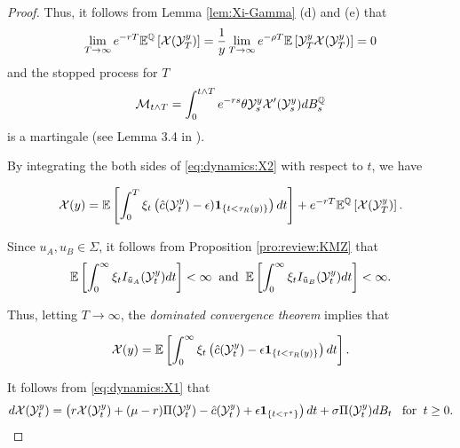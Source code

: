 \documentclass[a4paper,report, 11pt]{article}
\def\e{\epsilon}
\def\m{\mu}
\def\s{\sigma}
\def\t{\theta}
\begin{document}
\begin{proof}
	Thus, it follows from Lemma \ref{lem:Xi-Gamma} (d) and (e) that 
	\begin{align*}
	\lim_{T\to\infty}e^{-rT}\mathbb{E}^{\mathbb{Q}}\left[{\cal X}({\cal Y}_T^{y}) \right]=\dfrac{1}{y}\lim_{T\to\infty}e^{-\rho T}\mathbb{E}\left[{\cal Y}_T^{y}{\cal X}({\cal Y}_T^{y}) \right]=0
	\end{align*}
	and the stopped process for $T$
	$$
	{\cal M}_{t\wedge T} =\int_0^{t\wedge T} e^{-r s }\t {\cal Y}_s^{y}{\cal X}'({\cal Y}_s^{y})dB^\mathbb{Q}_s
	$$
	is a martingale (see Lemma 3.4 in \citet{KMZ}). 
	
	By integrating the both sides of \eqref{eq:dynamics:X2} with respect to $t$, we have 
	\begin{footnotesize}
		\begin{eqnarray*}
		\begin{split}
		{\cal X}(y) =\mathbb{E}\left[\int_0^{T}{\xi_t} \left(\hat{c}({\cal Y}_t^{y})-\e){\bf 1}_{\{t<\tau_R(y)\}}\right)dt\right] +e^{-r T} \mathbb{E}^{\mathbb{Q}}\left[{\cal X}({\cal Y}_T^{y}) \right].
		\end{split}
		\end{eqnarray*}
	\end{footnotesize}
	
	Since $u_A, u_B \in \Sigma$, it follows from Proposition \ref{pro:review:KMZ} that 
	\begin{equation*}
	\mathbb{E}\left[\int_0^\infty \xi_t I_{\tilde{u}_A}({\cal Y}_t^{y})dt\right]<\infty\;\;\mbox{and}\;\;\mathbb{E}\left[\int_0^\infty \xi_t I_{\tilde{u}_B}({\cal Y}_t^{y})dt\right]<\infty.
	\end{equation*}
	
	Thus, letting $T\to\infty$, the {\it dominated convergence theorem} implies that
	\begin{footnotesize}
		\begin{eqnarray*}
		\begin{split}
		{\cal X}(y)=\mathbb{E}\left[\int_0^{\infty}{\xi_t} \left(\hat{c}({\cal Y}_t^{y})-\e{\bf 1}_{\{t<\tau_R(y)\}}\right)dt\right].
		\end{split}
		\end{eqnarray*}
	\end{footnotesize}

It follows from \eqref{eq:dynamics:X1} that 
	\begin{equation*}
d{\cal X}({\cal Y}_t^{y})=\left( r{\cal X}({\cal Y}_t^{y})+(\m-r)\Pi({\cal Y}_t^y)-\hat{c}({\cal Y}_t^{y})+ \e{\bf 1}_{\{t<\tau^*\}}\right)dt+\s \Pi({\cal Y}_t^y) dB_t\;\;\;\mbox{for}\;\;t\ge 0.
\end{equation*}
\end{proof}
\end{document}

